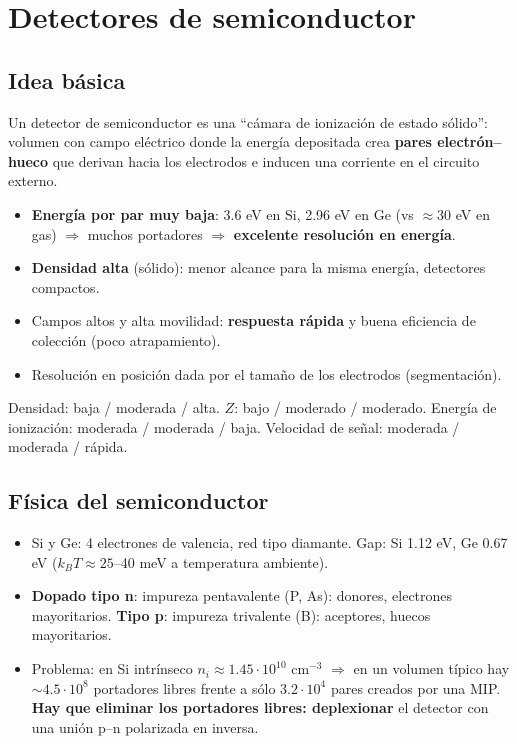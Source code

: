 \chapter{Detectores de semiconductor}

\section{Idea básica}
Un detector de semiconductor es una ``cámara de ionización de estado sólido'': volumen con campo
eléctrico donde la energía depositada crea \textbf{pares electrón--hueco} que derivan hacia los
electrodos e inducen una corriente en el circuito externo.

\begin{clave}
\begin{itemize}
\item \textbf{Energía por par muy baja}: 3.6 eV en Si, 2.96 eV en Ge (vs $\approx30$ eV en gas) $\Rightarrow$ muchos
portadores $\Rightarrow$ \textbf{excelente resolución en energía}.
\item \textbf{Densidad alta} (sólido): menor alcance para la misma energía, detectores compactos.
\item Campos altos y alta movilidad: \textbf{respuesta rápida} y buena eficiencia de colección (poco atrapamiento).
\item Resolución en posición dada por el tamaño de los electrodos (segmentación).
\end{itemize}
\end{clave}
\begin{dato}
Densidad: baja / moderada / alta. $Z$: bajo / moderado / moderado. Energía de ionización: moderada / moderada / baja.
Velocidad de señal: moderada / moderada / rápida.
\end{dato}

\section{Física del semiconductor}
\begin{itemize}
\item Si y Ge: 4 electrones de valencia, red tipo diamante. Gap: Si 1.12 eV, Ge 0.67 eV ($k_BT\approx25$--40 meV a temperatura ambiente).
\item \textbf{Dopado tipo n}: impureza pentavalente (P, As): donores, electrones mayoritarios.
\textbf{Tipo p}: impureza trivalente (B): aceptores, huecos mayoritarios.
\item Problema: en Si intrínseco $n_i\approx1.45\cdot10^{10}$ cm$^{-3}$ $\Rightarrow$ en un volumen típico hay $\sim4.5\cdot10^8$ portadores libres frente
a sólo $3.2\cdot10^4$ pares creados por una MIP. \textbf{Hay que eliminar los portadores libres: deplexionar} el detector
con una unión p--n polarizada en inversa.
\end{itemize}

